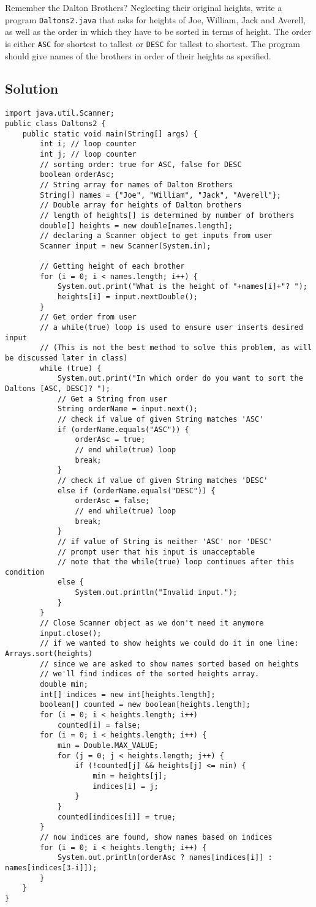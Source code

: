 \documentclass[12pt,letterpaper,twoside]{article}
\begin{document}
Remember the Dalton Brothers? Neglecting their original heights, write a program \texttt{Daltons2.java} that asks for heights of Joe, William, Jack and Averell, as well as the order in which they have to be sorted in terms of height. The order is either \texttt{ASC} for shortest to tallest or \texttt{DESC} for tallest to shortest. The program should give names of the brothers in order of their heights as specified.

\subsection*{Solution}

\begin{lstlisting}
import java.util.Scanner;
public class Daltons2 {
	public static void main(String[] args) {
		int i; // loop counter
		int j; // loop counter
		// sorting order: true for ASC, false for DESC
		boolean orderAsc;
		// String array for names of Dalton Brothers
		String[] names = {"Joe", "William", "Jack", "Averell"};
		// Double array for heights of Dalton brothers
		// length of heights[] is determined by number of brothers
		double[] heights = new double[names.length];
		// declaring a Scanner object to get inputs from user
		Scanner input = new Scanner(System.in);

		// Getting height of each brother
		for (i = 0; i < names.length; i++) {
			System.out.print("What is the height of "+names[i]+"? ");
			heights[i] = input.nextDouble();
		}
		// Get order from user
		// a while(true) loop is used to ensure user inserts desired input
		// (This is not the best method to solve this problem, as will be discussed later in class)
		while (true) {
			System.out.print("In which order do you want to sort the Daltons [ASC, DESC]? ");
			// Get a String from user
			String orderName = input.next();
			// check if value of given String matches 'ASC'
			if (orderName.equals("ASC")) {
				orderAsc = true;
				// end while(true) loop
				break;
			}
			// check if value of given String matches 'DESC'
			else if (orderName.equals("DESC")) {
				orderAsc = false;
				// end while(true) loop
				break;
			}
			// if value of String is neither 'ASC' nor 'DESC'
			// prompt user that his input is unacceptable
			// note that the while(true) loop continues after this condition
			else {
				System.out.println("Invalid input.");
			}
		}
		// Close Scanner object as we don't need it anymore
		input.close();
		// if we wanted to show heights we could do it in one line: Arrays.sort(heights)
		// since we are asked to show names sorted based on heights
		// we'll find indices of the sorted heights array.
		double min;
		int[] indices = new int[heights.length];
		boolean[] counted = new boolean[heights.length];
		for (i = 0; i < heights.length; i++)
			counted[i] = false;
		for (i = 0; i < heights.length; i++) {
			min = Double.MAX_VALUE;
			for (j = 0; j < heights.length; j++) {
				if (!counted[j] && heights[j] <= min) {
					min = heights[j];
					indices[i] = j;
				}
			}
			counted[indices[i]] = true;
		}
		// now indices are found, show names based on indices
		for (i = 0; i < heights.length; i++) {
			System.out.println(orderAsc ? names[indices[i]] : names[indices[3-i]]);
		}
	}
}
\end{lstlisting}
\end{document}
